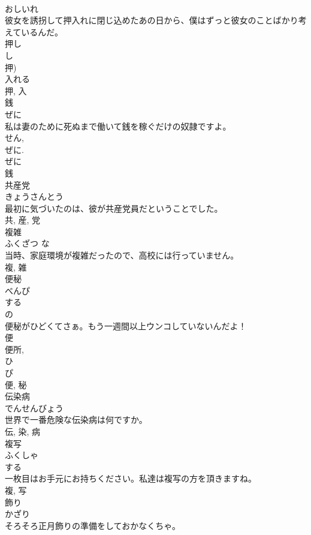 \documentclass[8pt]{extreport}
\begin{document}
\begin{CJK}{UTF8}{min}
\\	おしいれ	
\\	彼女を誘拐して押入れに閉じ込めたあの日から、僕はずっと彼女のことばかり考えているんだ。	
\\	押し 
\\	し 
\\	押) 
\\	入れる
\\	押, 入	
\\	銭	
\\	ぜに	
\\	私は妻のために死ぬまで働いて銭を稼ぐだけの奴隷ですよ。	
\\	せん, 
\\	ぜに. 
\\	ぜに 
\\	銭	
\\	共産党	
\\	きょうさんとう	
\\	最初に気づいたのは、彼が共産党員だということでした。	
\\	共, 産, 党	
\\	複雑	
\\	ふくざつ	な 
\\	当時、家庭環境が複雑だったので、高校には行っていません。	
\\	複, 雑	
\\	便秘	
\\	べんぴ	
\\	する 
\\	の 
\\	便秘がひどくてさぁ。もう一週間以上ウンコしていないんだよ！	
\\	便 
\\	便所, 
\\	ひ 
\\	ぴ 
\\	便, 秘	
\\	伝染病	
\\	でんせんびょう	
\\	世界で一番危険な伝染病は何ですか。	
\\	伝, 染, 病	
\\	複写	
\\	ふくしゃ	
\\	する 
\\	一枚目はお手元にお持ちください。私達は複写の方を頂きますね。	
\\	複, 写	
\\	飾り	
\\	かざり	
\\	そろそろ正月飾りの準備をしておかなくちゃ。	

\end{CJK}
\end{document}
